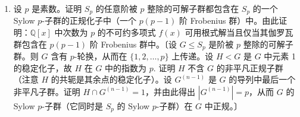\begin{enumerate}
（b）反之证明：若 \(K\) 可以嵌入（a）中那样的 4 次循环扩张 \(L\)，则 \(D\) 是两个平方之和。〔一种途径：（i）先注意 \(L\) 在 \(K\) 上是二次的，故 \(L = K(\sqrt{a+b\sqrt{D}})\)（\(a, b \in \mathbb{Q}\)）；（ii）证明 \(L\) 包含二次子域 \(\mathbb{Q}(\sqrt{a^2-b^2D})\)，若 \(L/\mathbb{Q}\) 是循环的则它必为 \(\mathbb{Q}(\sqrt{D})\)，并利用习题 7。〕

（c）特别地证明 \(\mathbb{Q}(\sqrt{3})\) 不是 \(\mathbb{Q}\) 上任何 4 次循环扩张的子域。类似地证明：对无平方因子且 \(D < 0\) 的整数 \(D\)，域 \(\mathbb{Q}(\sqrt{D})\) 从不包含在 \(\mathbb{Q}\) 的 4 次循环扩张中（这给出了第 14.6 节习题 19 的另一种证明）。

\item 设 \(p\) 是素数。证明 \(S_p\) 的任意阶被 \(p\) 整除的可解子群都包含在 \(S_p\) 的一个 Sylow \(p\)-子群的正规化子中（一个 \(p(p-1)\) 阶 Frobenius 群）中。由此证明：\(\mathbb{Q}[x]\) 中次数为 \(p\) 的不可约多项式 \(f(x)\) 可用根式解当且仅当其伽罗瓦群包含在 \(p(p-1)\) 阶 Frobenius 群中。〔设 \(G \leq S_p\) 是阶被 \(p\) 整除的可解子群。则 \(G\) 含有 \(p\)-轮换，从而在 \(\{1, 2, \ldots, p\}\) 上传递。设 \(H < G\) 是 \(G\) 中元素 1 的稳定化子，故 \(H\) 在 \(G\) 中的指数为 \(p\). 证明 \(H\) 不含 \(G\) 的非平凡正规子群（注意 \(H\) 的共轭是其余点的稳定化子）。设 \(G^{(n-1)}\) 是 \(G\) 的导列中最后一个非平凡子群。证明 \(H \cap G^{(n-1)} = 1\)，并由此得出 \(|G^{(n-1)}| = p\)，从而 \(G\) 的 Sylow \(p\)-子群（它同时是 \(S_p\) 的 Sylow \(p\)-子群）在 \(G\) 中正规。〕


\end{enumerate}
